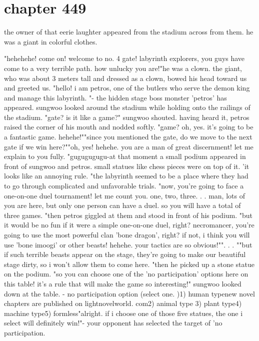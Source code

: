 \section{chapter 449}

the owner of that eerie laughter appeared from the stadium across from them.
 he was a giant in colorful clothes.





"hehehehe! come on! welcome to no.
 4 gate! labyrinth explorers, you guys have come to a very terrible path.
 how unlucky you are!"he was a clown.
 the giant, who was about 3 meters tall and dressed as a clown, bowed his head toward us and greeted us.
 "hello! i am petros, one of the butlers who serve the demon king and manage this labyrinth.
"- the hidden stage boss monster 'petros' has appeared.
sungwoo looked around the stadium while holding onto the railings of the stadium.
 "gate? is it like a game?" sungwoo shouted.
 having heard it, petros raised the corner of his mouth and nodded softly.
"game? oh, yes.
 it's going to be a fantastic game.
 hehehe!""since you mentioned the gate, do we move to the next gate if we win here?""oh, yes! hehehe.
 you are a man of great discernment! let me explain to you fully.
"gugugugugu-at that moment a small podium appeared in front of sungwoo and petros.
 small statues like chess pieces were on top of it.
 'it looks like an annoying rule.
"the labyrinth seemed to be a place where they had to go through complicated and unfavorable trials.
"now, you're going to face a one-on-one duel tournament! let me count you.
 one, two, three.
.
.
man, lots of you are here, but only one person can have a duel.
 so you will have a total of three games.
"then petros giggled at them and stood in front of his podium.
"but it would be no fun if it were a simple one-on-one duel, right? necromancer, you're going to use the most powerful clan 'bone dragon', right? if not, i think you will use 'bone imoogi' or other beasts! hehehe.
 your tactics are so obvious!"".
.
.
""but if such terrible beasts appear on the stage, they're going to make our beautiful stage dirty, so i won't allow them to come here.
"then he picked up a stone statue on the podium.
"so you can choose one of the 'no participation' options here on this table! it's a rule that will make the game so interesting!"
sungwoo looked down at the table.
- no participation option (select one.
)1) human typenew novel chapters are published on lightnovelworld.
com2) animal type 3) plant type4) machine type5) formless"alright.
 if i choose one of those five statues, the one i select will definitely win!"- your opponent has selected the target of 'no participation.
